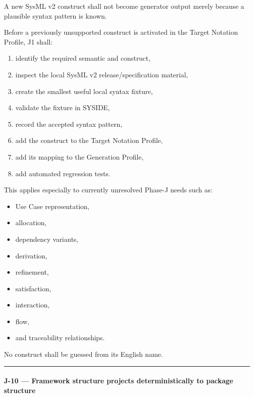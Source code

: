 A new SysML v2 construct shall not become generator output merely because a plausible syntax pattern is known.

Before a previously unsupported construct is activated in the Target Notation Profile, J1 shall:

\begin{enumerate}
\def\labelenumi{\arabic{enumi}.}
\tightlist
\item
  identify the required semantic and construct,
\item
  inspect the local SysML v2 release/specification material,
\item
  create the smallest useful local syntax fixture,
\item
  validate the fixture in SYSIDE,
\item
  record the accepted syntax pattern,
\item
  add the construct to the Target Notation Profile,
\item
  add its mapping to the Generation Profile,
\item
  add automated regression tests.
\end{enumerate}

This applies especially to currently unresolved Phase-J needs such as:

\begin{itemize}
\tightlist
\item
  Use Case representation,
\item
  allocation,
\item
  dependency variants,
\item
  derivation,
\item
  refinement,
\item
  satisfaction,
\item
  interaction,
\item
  flow,
\item
  and traceability relationships.
\end{itemize}

No construct shall be guessed from its English name.

\begin{center}\rule{0.5\linewidth}{0.5pt}\end{center}

\hypertarget{j-10--framework-structure-projects-deterministically-to-package-structure}{%
\paragraph{J-10 --- Framework structure projects deterministically to package structure}\label{j-10--framework-structure-projects-deterministically-to-package-structure}}

